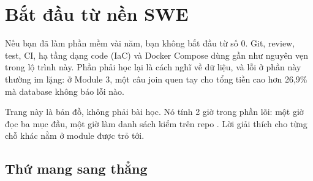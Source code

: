 \section{Bắt đầu từ nền SWE}

Nếu bạn đã làm phần mềm vài năm, bạn không bắt đầu từ số 0. Git, review, test, CI, hạ tầng dạng code (IaC) và Docker Compose dùng gần như nguyên vẹn trong lộ trình này. Phần phải học lại là cách nghĩ về dữ liệu, và lỗi ở phần này thường im lặng: ở Module 3, một câu join quen tay cho tổng tiền cao hơn 26,9\% mà database không báo lỗi nào.

Trang này là bản đồ, không phải bài học. Nó tính 2 giờ trong phần lõi: một giờ đọc ba mục đầu, một giờ làm danh sách kiểm trên repo . Lời giải thích cho từng chỗ khác nằm ở module được trỏ tới.

\subsection{Thứ mang sang thẳng}

